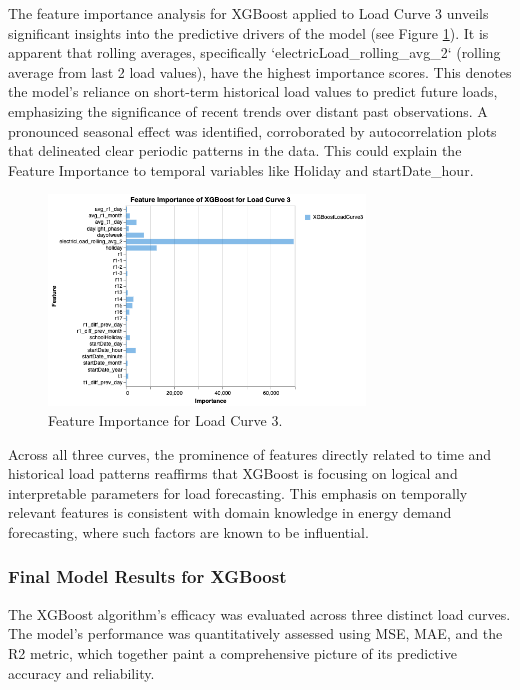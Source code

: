\documentclass{article} %
\begin{document}
The feature importance analysis for XGBoost applied to Load Curve 3 unveils significant insights into the predictive drivers of the model (see Figure \ref{fig:feature_importance_3}). 
It is apparent that rolling averages, specifically `electricLoad\_rolling\_avg\_2` (rolling average from last 2 load values), have the highest importance scores. This denotes the model's reliance on short-term historical load values to predict future loads, emphasizing the significance of recent trends over distant past observations. 
A pronounced seasonal effect was identified, corroborated by autocorrelation plots that delineated clear periodic patterns in the data. This could explain the Feature Importance to temporal variables like Holiday and startDate\_hour.

\begin{figure}[H]
    \centering
    \includegraphics[width=0.75\textwidth]{ressources/FeatureImportance/Feature Importance 3.png}
    \caption{Feature Importance for Load Curve 3.}
    \label{fig:feature_importance_3}
\end{figure}
Across all three curves, the prominence of features directly related to time and historical load patterns reaffirms that XGBoost is focusing on logical and interpretable parameters for load forecasting. This emphasis on temporally relevant features is consistent with domain knowledge in energy demand forecasting, where such factors are known to be influential.

\subsubsection{Final Model Results for XGBoost}
The XGBoost algorithm's efficacy was evaluated across three distinct load curves. The model's performance was quantitatively assessed using \gls{MSE}, \gls{MAE}, and the \gls{R2} metric, which together paint a comprehensive picture of its predictive accuracy and reliability.
\end{document}
